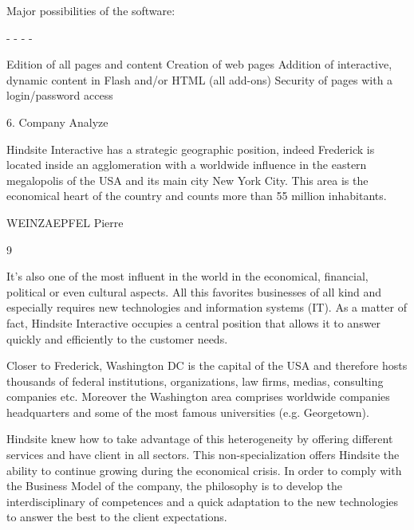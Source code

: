 Major possibilities of the software:

-
-
-
-

Edition of all pages and content
Creation of web pages
Addition of interactive, dynamic content in Flash and/or HTML (all add-ons)
Security of pages with a login/password access

6. Company Analyze

Hindsite Interactive has a strategic geographic position, indeed Frederick is
located inside an agglomeration with a worldwide influence in the eastern
megalopolis of the USA and its main city New York City. This area is the
economical heart of the country and counts more than 55 million inhabitants.

WEINZAEPFEL Pierre

9

It’s also one of the most influent in the world in the economical, financial,
political or even cultural aspects. All this favorites businesses of all kind and
especially requires new technologies and information systems (IT). As a
matter of fact, Hindsite Interactive occupies a central position that allows it to
answer quickly and efficiently to the customer needs.

Closer to Frederick, Washington DC is the capital of the USA and therefore
hosts thousands of federal institutions, organizations, law firms, medias,
consulting companies etc. Moreover the Washington area comprises
worldwide companies headquarters and some of the most famous universities
(e.g. Georgetown).

Hindsite knew how to take advantage of this heterogeneity by offering different
services and have client in all sectors. This non-specialization offers Hindsite
the ability to continue growing during the economical crisis.
In order to comply with the Business Model of the company, the philosophy is
to develop the interdisciplinary of competences and a quick adaptation to the
new technologies to answer the best to the client expectations.